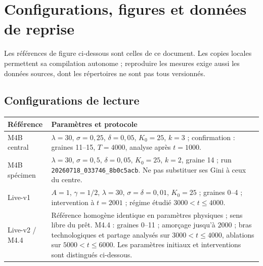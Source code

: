 \section{Configurations, figures et données de reprise}
\label{sec:sources_revision}
Les références de figure ci-dessous sont celles de ce document. Les copies
locales permettent sa compilation autonome ; reproduire les mesures exige
aussi les données sources, dont les répertoires ne sont pas tous versionnés.
\subsection{Configurations de lecture}
\begin{longtable}{@{}p{.19\linewidth}p{.75\linewidth}@{}}
\toprule Référence & Paramètres et protocole \\
\midrule\endhead
M4B central & $\lambda=30$, $\sigma=0{,}25$, $\delta=0{,}05$, $K_0=25$, $k=3$ ; confirmation : graines 11--15, $T=4000$, analyse après $t=1000$. \\
M4B spécimen & $\lambda=30$, $\sigma=0{,}5$, $\delta=0{,}05$, $K_0=25$, $k=2$, graine 14 ; run \texttt{20260718\_033746\_8b0c5acb}. Ne pas substituer ses Gini à ceux du centre. \\
Live-v1 & $A=1$, $\gamma=1/2$, $\lambda=30$, $\sigma=\delta=0{,}01$, $K_0=25$ ; graines 0--4 ; intervention à $t=2001$ ; régime étudié $3000<t\le4000$. \\
Live-v2 / M4.4 & Référence homogène identique en paramètres physiques ; sens libre du prêt. M4.4 : graines 0--11 ; amorçage jusqu'à $2000$ ; bras technologiques et partage analysés sur $3000<t\le4000$, ablations sur $5000<t\le6000$. Les paramètres initiaux et interventions sont distingués ci-dessous. \\
\bottomrule\end{longtable}
